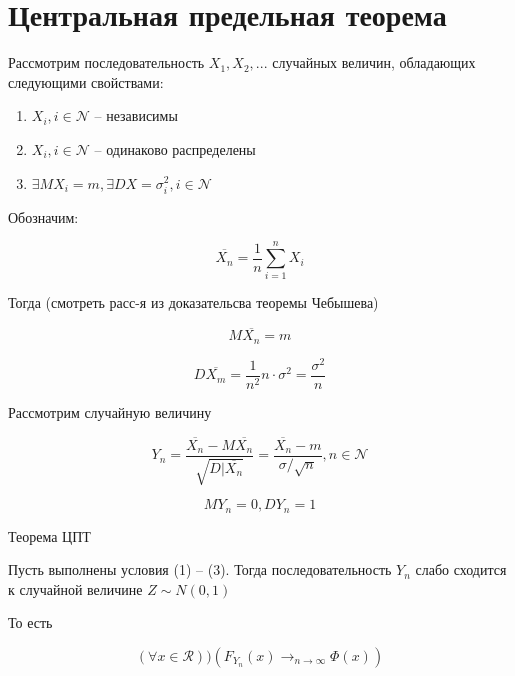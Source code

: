 \section{Центральная предельная теорема}

Рассмотрим последовательность $X_1, X_2, ...$ случайных величин, обладающих следующими свойствами:

\begin{enumerate}
    \item $X_i, i \in \mathcal N$ -- независимы
    \item $X_i, i \in \mathcal N$ -- одинаково распределены
    \item $\exists MX_i = m, \exists DX = \sigma_i^2, i \in \mathcal N$
\end{enumerate}

Обозначим:

\begin{equation*}
    \overline{X_n} = \frac{1}{n} \sum_{i=1}^n X_i
\end{equation*}

Тогда (смотреть расс-я из доказательсва теоремы Чебышева)

\begin{equation*}
    M\overline{X_n} = m
\end{equation*}

\begin{equation*}
    D\overline{X_m} = \frac{1}{n^2} n \cdot \sigma^2 = \frac{\sigma^2}{n}
\end{equation*}

Рассмотрим случайную величину

\begin{equation*}
    Y_n = \frac{\overline{X_n} - M\overline{X_n}}{\sqrt{D|\overline{X_n}}} = \frac{\overline{X_n} - m}{\sigma / \sqrt{n}}, n \in \mathcal N
\end{equation*}

\begin{equation*}
    MY_n = 0, DY_n = 1
\end{equation*}

Теорема ЦПТ

Пусть выполнены условия (1) -- (3). Тогда последовательность $Y_n$ слабо сходится к случайной величине $Z \sim N(0,1)$

То есть

\begin{equation*}
    (\forall x \in \mathcal R))(F_{Y_n}(x) \to_{n\to\infty} \Phi(x))
\end{equation*}

